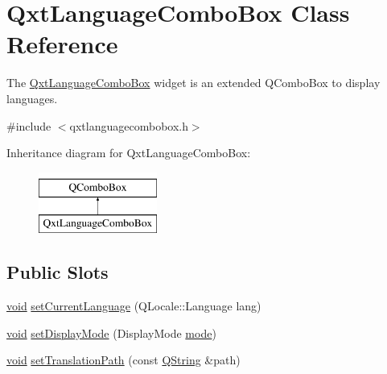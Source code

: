 \hypertarget{class_qxt_language_combo_box}{\section{Qxt\-Language\-Combo\-Box Class Reference}
\label{class_qxt_language_combo_box}
}


The \hyperlink{class_qxt_language_combo_box}{Qxt\-Language\-Combo\-Box} widget is an extended Q\-Combo\-Box to display languages.  




{\ttfamily \#include $<$qxtlanguagecombobox.\-h$>$}

Inheritance diagram for Qxt\-Language\-Combo\-Box\-:\begin{figure}[H]
\begin{center}
\leavevmode
\includegraphics[height=2.000000cm]{class_qxt_language_combo_box}
\end{center}
\end{figure}
\subsection*{Public Slots}
\begin{DoxyCompactItemize}
\item 
\hyperlink{group___u_a_v_objects_plugin_ga444cf2ff3f0ecbe028adce838d373f5c}{void} \hyperlink{class_qxt_language_combo_box_a7e1b7116a9586f304de18a942216f0fd}{set\-Current\-Language} (Q\-Locale\-::\-Language lang)
\item 
\hyperlink{group___u_a_v_objects_plugin_ga444cf2ff3f0ecbe028adce838d373f5c}{void} \hyperlink{class_qxt_language_combo_box_a1d6e4ae97b0fb98c55c7574c1035bcdf}{set\-Display\-Mode} (Display\-Mode \hyperlink{glext_8h_a1e71d9c196e4683cc06c4b54d53f7ef5}{mode})
\item 
\hyperlink{group___u_a_v_objects_plugin_ga444cf2ff3f0ecbe028adce838d373f5c}{void} \hyperlink{class_qxt_language_combo_box_aa254f2fb0316aa46905a4a893b1a041e}{set\-Translation\-Path} (const \hyperlink{group___u_a_v_objects_plugin_gab9d252f49c333c94a72f97ce3105a32d}{Q\-String} \&path)
\end{DoxyCompactItemize}
